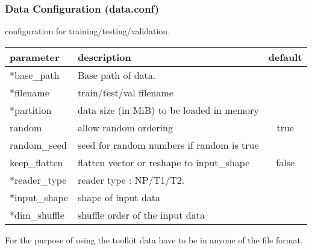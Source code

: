 \subsubsection{Data Configuration (data.conf)}
\begin{table}[!htbp]
\begin{center}
  \medskip  \small configuration for training/testing/validation.
   \begin{tabular}{|l|p{8cm}|c|} \hline
   	\textbf{parameter} & \textbf{description} & \textbf{default}\\  \hline
 	*base\_path & Base path of data. &  \\  \hline
   	*filename &  train/test/val filename & \\  \hline
	*partition & data size (in MiB) to be loaded in memory & \\  \hline
	random & allow random ordering  & true \\  \hline
	random\_seed & seed for random numbers if random is true & \\  \hline 
	keep\_flatten & flatten vector or reshape to input\_shape & false \\  \hline
	*reader\_type & reader type : NP/T1/T2. & \\  \hline		
	*input\_shape & shape of input data & \\  \hline
	*dim\_shuffle &  shuffle order of the input data &  \\ \hline
  \end{tabular}		
\end{center}
\end{table} 
\noindent For the purpose of using the toolkit data have to be in anyone of the file format.
